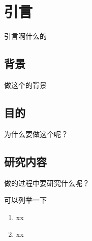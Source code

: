 \chapter{引言}
\label{cha:intro}

引言啊什么的~

\section{背景}
\label{sec:background}

做这个的背景~

\section{目的}
\label{sec:target}

为什么要做这个呢？

\section{研究内容}
\label{sec:target}

做的过程中要研究什么呢？

可以列举一下

\begin{enumerate}
  \item xx
  \item xx
\end{enumerate}